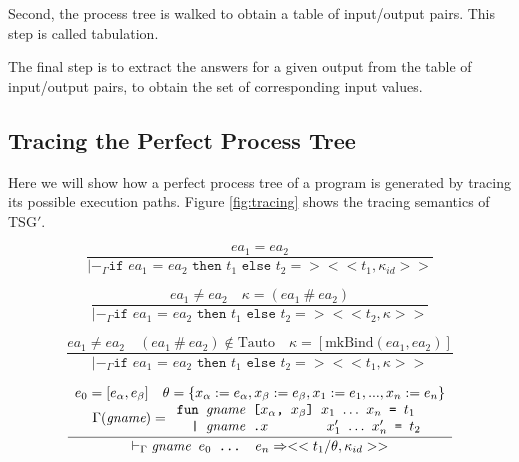 \documentclass[10pt]{../sigplanconf}
\newcommand{\nfrac}[2]{\frac{\displaystyle{#1}}{\displaystyle{#2}}}
\newcommand{\tagsc}[1]{\tag{\scshape #1}}
\begin{document}
Second, the process tree is walked to obtain a table of input/output
pairs. This step is called tabulation.

The final step is to extract the answers for a given output from the
table of input/output pairs, to obtain the set of corresponding input
values.


\subsection{Tracing the Perfect Process Tree}
Here we will show how a perfect process tree of a program is generated
by tracing its possible execution paths. Figure \ref{fig:tracing}
shows the tracing semantics of TSG$'$.

\begin{figure}
  \begin{equation}
    \nfrac{
      ea_1 = ea_2
    }{
      |-_\Gamma \texttt{if $ea_1$ = $ea_2$ then $t_1$ else $t_2$} => <<t_1, \kappa_{id}>>
    } \tagsc{If-Eq}
  \end{equation}

  \begin{equation}
    \nfrac{
      ea_1 \neq ea_2 \quad \kappa = (ea_1\ \#\ ea_2)
    }{
      |-_\Gamma \texttt{if $ea_1$ = $ea_2$ then $t_1$ else $t_2$} => <<t_2, \kappa>>
    } \tagsc{If-NotEq}
  \end{equation}

  \begin{equation}
    \nfrac{
      ea_1 \neq ea_2 \quad (ea_1\ \#\ ea_2) \not \in \textrm{Tauto} \quad \kappa = [\textrm{mkBind}(ea_1, ea_2)]
    }{
      |-_\Gamma \texttt{if $ea_1$ = $ea_2$ then $t_1$ else $t_2$} => <<t_1, \kappa>>
    } \tagsc{If-BindVar}
  \end{equation}

  \begin{equation}
    \nfrac{
      \begin{array}{c}
        e_0 = [e_\alpha, e_\beta] \quad \theta = \{ x_\alpha := e_\alpha, x_\beta := e_\beta, x_1 := e_1, ..., x_n := e_n \} \\
        \Gamma(\textit{gname}) =
        \begin{array}{l}
          \texttt{fun \textit{\rmfamily gname} [$x_\alpha$, $x_\beta$] $x_1$ $\ldots$ $x_n$ = $t_1$} \\
          \texttt{\ \ | \textit{\rmfamily gname}\ \texttt{.}$x$ \hspace{1.1cm} $x_1'$ $\ldots$ $x_n'$ = $t_2$} \\
        \end{array}
      \end{array}
    }{
      |-_\Gamma \texttt{\textit{\rmfamily gname} $e_0$ ... $e_n$} => <<t_1 / \theta, \kappa_{id} >>
    }
  \end{equation}


\end{figure}
\end{document}
